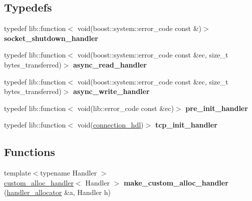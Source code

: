 \subsection*{Typedefs}
\begin{DoxyCompactItemize}
\item 
typedef lib\+::function$<$ void(boost\+::system\+::error\+\_\+code const \&)$>$ {\bfseries socket\+\_\+shutdown\+\_\+handler}\hypertarget{namespacewebsocketpp_1_1transport_1_1asio_aaec0e9b187575d1b0a9613ed5f8d1548}{}\label{namespacewebsocketpp_1_1transport_1_1asio_aaec0e9b187575d1b0a9613ed5f8d1548}

\item 
typedef lib\+::function$<$ void(boost\+::system\+::error\+\_\+code const \&ec, size\+\_\+t bytes\+\_\+transferred)$>$ {\bfseries async\+\_\+read\+\_\+handler}\hypertarget{namespacewebsocketpp_1_1transport_1_1asio_a688224ed13b248f892851ef2935954a3}{}\label{namespacewebsocketpp_1_1transport_1_1asio_a688224ed13b248f892851ef2935954a3}

\item 
typedef lib\+::function$<$ void(boost\+::system\+::error\+\_\+code const \&ec, size\+\_\+t bytes\+\_\+transferred)$>$ {\bfseries async\+\_\+write\+\_\+handler}\hypertarget{namespacewebsocketpp_1_1transport_1_1asio_a899edd0e1d988bea9ef7c94683f0e76e}{}\label{namespacewebsocketpp_1_1transport_1_1asio_a899edd0e1d988bea9ef7c94683f0e76e}

\item 
typedef lib\+::function$<$ void(lib\+::error\+\_\+code const \&ec)$>$ {\bfseries pre\+\_\+init\+\_\+handler}\hypertarget{namespacewebsocketpp_1_1transport_1_1asio_ad084554aff8b16e5c5d9a51ef82939cf}{}\label{namespacewebsocketpp_1_1transport_1_1asio_ad084554aff8b16e5c5d9a51ef82939cf}

\item 
typedef lib\+::function$<$ void(\hyperlink{namespacewebsocketpp_a6b3d26a10ee7229b84b776786332631d}{connection\+\_\+hdl})$>$ {\bfseries tcp\+\_\+init\+\_\+handler}\hypertarget{namespacewebsocketpp_1_1transport_1_1asio_ad12345b8638872037c87db068467233d}{}\label{namespacewebsocketpp_1_1transport_1_1asio_ad12345b8638872037c87db068467233d}

\end{DoxyCompactItemize}
\subsection*{Functions}
\begin{DoxyCompactItemize}
\item 
{\footnotesize template$<$typename Handler $>$ }\\\hyperlink{classwebsocketpp_1_1transport_1_1asio_1_1custom__alloc__handler}{custom\+\_\+alloc\+\_\+handler}$<$ Handler $>$ {\bfseries make\+\_\+custom\+\_\+alloc\+\_\+handler} (\hyperlink{classwebsocketpp_1_1transport_1_1asio_1_1handler__allocator}{handler\+\_\+allocator} \&a, Handler h)\hypertarget{namespacewebsocketpp_1_1transport_1_1asio_a2ff04709483387d7b8c542dd7575f885}{}\label{namespacewebsocketpp_1_1transport_1_1asio_a2ff04709483387d7b8c542dd7575f885}

\end{DoxyCompactItemize}



